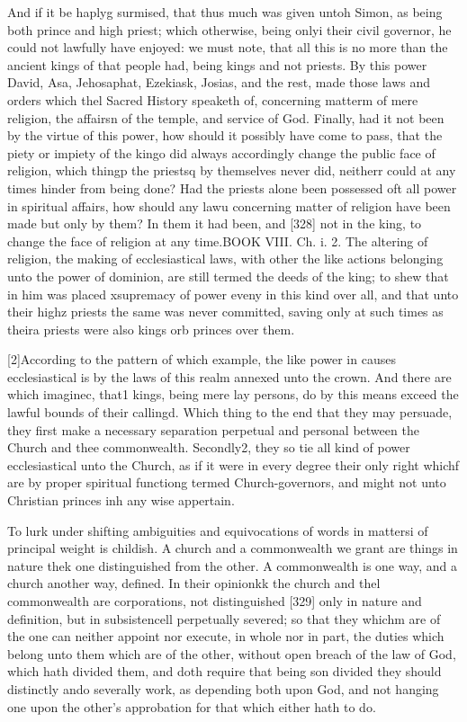 And if it be haplyg surmised, that thus much was given untoh Simon, as being both prince and high priest; which otherwise, being onlyi their civil governor, he could not lawfully have enjoyed: we must note, that all this is no more than the ancient kings of that people had, being kings and not priests. By this power David, Asa, Jehosaphat, Ezekiask, Josias, and the rest, made those laws and orders which thel Sacred History speaketh of, concerning matterm of mere religion, the affairsn of the temple, and service of God. Finally, had it not been by the virtue of this power, how should it possibly have come to pass, that the piety or impiety of the kingo did always accordingly change the public face of religion, which thingp the priestsq by themselves never did, neitherr could at any times hinder from being done? Had the priests alone been possessed oft all power in spiritual affairs, how should any lawu concerning matter of religion have been made but only by them? In them it had been, and [328] not in the king, to change the face of religion at any time.BOOK VIII. Ch. i. 2. The altering of religion, the making of ecclesiastical laws, with other the like actions belonging unto the power of dominion, are still termed the deeds of the king; to shew that in him was placed xsupremacy of power eveny in this kind over all, and that unto their highz priests the same was never committed, saving only at such times as theira priests were also kings orb princes over them.

[2]According to the pattern of which example, the like power in causes ecclesiastical is by the laws of this realm annexed unto the crown. And there are which imaginec, that1 kings, being mere lay persons, do by this means exceed the lawful bounds of their callingd. Which thing to the end that they may persuade, they first make a necessary separation perpetual and personal between the Church and thee commonwealth. Secondly2, they so tie all kind of power ecclesiastical unto the Church, as if it were in every degree their only right whichf are by proper spiritual functiong termed Church-governors, and might not unto Christian princes inh any wise appertain.

To lurk under shifting ambiguities and equivocations of words in mattersi of principal weight is childish. A church and a commonwealth we grant are things in nature thek one distinguished from the other. A commonwealth is one way, and a church another way, defined. In their opinionkk the church and thel commonwealth are corporations, not distinguished [329] only in nature and definition, but in subsistencell perpetually severed; so that they whichm are of the one can neither appoint nor execute, in whole nor in part, the duties which belong unto them which are of the other, without open breach of the law of God, which hath divided them, and doth require that being son divided they should distinctly ando severally work, as depending both upon God, and not hanging one upon the other’s approbation for that which either hath to do.

